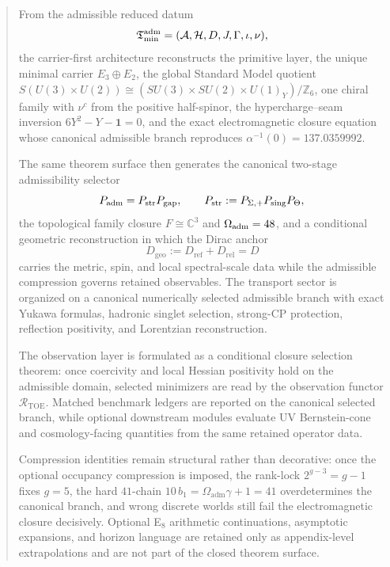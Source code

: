 
\maketitle

\begin{abstract}
From the admissible reduced datum
\[
\Tmin^{\mathrm{adm}}=(\mathcal A,\mathcal H,D,J,\Gamma,\inv,\nu),
\]
the carrier-first architecture reconstructs the primitive layer, the unique minimal carrier
$E_3\oplus E_2$, the global Standard Model quotient
$S(U(3)\times U(2))\cong(SU(3)\times SU(2)\times U(1)_Y)/\mathbb Z_6$, one chiral family
with $\nu^c$ from the positive half-spinor, the hypercharge--seam inversion
$6Y^2-Y-\mathbf 1=0$, and the exact electromagnetic closure equation whose canonical
admissible branch reproduces $\alpha^{-1}(0)=\num{137.0359992}$.

The same theorem surface then generates the canonical two-stage admissibility selector
\[
\Padm=P_{\mathrm{str}}P_{\mathrm{gap}},
\qquad
P_{\mathrm{str}}:=P_{\Seam,+}P_{\mathrm{sing}}P_\Theta,
\]
the topological family closure $F\cong\mathbb C^3$ and $\Oadm=48$, and a conditional
geometric reconstruction in which the Dirac anchor
\[
D_{\mathrm{geo}}:=D_{\mathrm{ref}}+D_{\mathrm{rel}}=D
\]
carries the metric, spin, and local spectral-scale data while the admissible compression
governs retained observables. The transport sector is organized on a canonical numerically
selected admissible branch with exact Yukawa formulas, hadronic singlet selection,
strong-CP protection, reflection positivity, and Lorentzian reconstruction.

The observation layer is formulated as a conditional closure selection theorem: once
coercivity and local Hessian positivity hold on the admissible domain, selected minimizers
are read by the observation functor $\mathcal R_{\mathrm{TOE}}$. Matched benchmark ledgers
are reported on the canonical selected branch, while optional downstream modules evaluate
UV Bernstein-cone and cosmology-facing quantities from the same retained operator data.

Compression identities remain structural rather than decorative: once the optional occupancy
compression is imposed, the rank-lock $2^{g-3}=g-1$ fixes $g=5$, the hard $41$-chain
$10\,b_1=\Omega_{\mathrm{adm}}\gamma+1=41$ overdetermines the canonical branch, and wrong
discrete worlds still fail the electromagnetic closure decisively. Optional E$_8$
arithmetic continuations, asymptotic expansions, and horizon language are retained only as
appendix-level extrapolations and are not part of the closed theorem surface.
\end{abstract}

